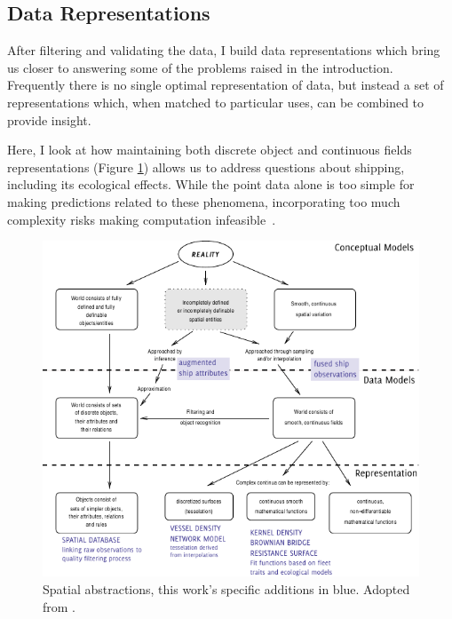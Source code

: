 
\subsection{Data Representations}

After filtering and validating the data, I build data representations which bring us closer to answering some of the problems raised in the introduction. Frequently there is no single optimal representation of data, but instead a set of representations which, when matched to particular uses, can be combined to provide insight.

Here, I look at how maintaining both discrete object and continuous fields representations (Figure \ref{fig:representation-in-gis}) allows us to address questions about shipping, including its ecological effects. While the point data alone is too simple for making predictions related to these phenomena, incorporating too much complexity risks making computation infeasible~\citep{de2007geospatial}.


\begin{figure}[htbp]
  \centering
  \includegraphics[width=155mm]{figures/representation-in-gis.pdf}
  \caption[Spatial Abstractions]{Spatial abstractions, this work's specific {\color{DBlue} additions in blue}. Adopted from \cite{Bivand2011}.}
  \label{fig:representation-in-gis}
\end{figure}

